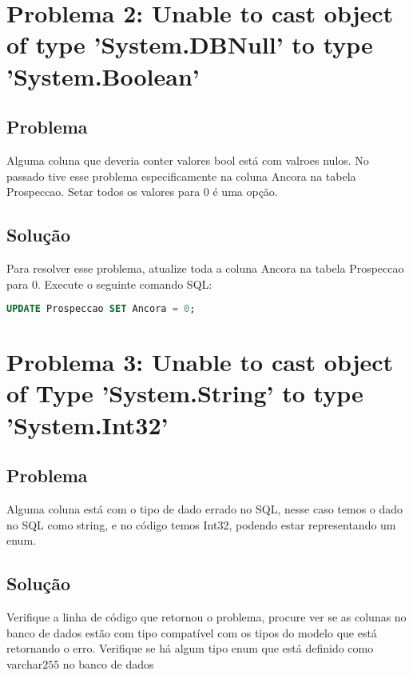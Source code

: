 \documentclass[12pt]{article}
\begin{document}
\section{Problema 2: Unable to cast object of type 'System.DBNull' to type 'System.Boolean'}
\subsection{Problema}
Alguma coluna que deveria conter valores bool está com valroes nulos.
No passado tive esse problema especificamente na coluna Ancora na tabela Prospeccao. Setar todos os valores para 0 é uma opção.

\subsection{Solução}
Para resolver esse problema, atualize toda a coluna Ancora na tabela Prospeccao para 0. Execute o seguinte comando SQL:

\begin{lstlisting}[language=SQL]
UPDATE Prospeccao SET Ancora = 0;
\end{lstlisting}

\section{Problema 3: Unable to cast object of Type 'System.String' to type 'System.Int32'}
\subsection{Problema}
Alguma coluna está com o tipo de dado errado no SQL, nesse caso temos o dado no SQL como string, e no código temos Int32, podendo estar representando um enum.

\subsection{Solução}
Verifique a linha de código que retornou o problema, procure ver se as colunas no banco de dados estão com tipo compatível com os tipos do modelo que está retornando o erro.
Verifique se há algum tipo enum que está definido como varchar\(255\) no banco de dados
\end{document}

